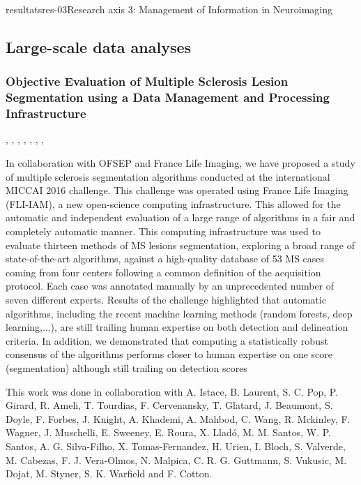 \documentclass{ra2018}
\begin{document}
\begin{module}{resultats}{res-03}{Research axis 3: Management of Information in Neuroimaging}

\subsection{Large-scale data analyses}
\subsubsection{Objective Evaluation of Multiple Sclerosis Lesion Segmentation using a Data Management and Processing Infrastructure}
\begin{participants}
      ,
      ,
      ,
      ,
      ,
      ,
      ,
\end{participants}
In collaboration with OFSEP and France Life Imaging, we have proposed a study of multiple sclerosis segmentation algorithms conducted at the international MICCAI 2016 challenge. This challenge was operated using France Life Imaging (FLI-IAM), a new open-science computing infrastructure. This allowed for the automatic and independent evaluation of a large range of algorithms in a fair and completely automatic manner. This computing infrastructure was used to evaluate thirteen methods of MS lesions segmentation, exploring a broad range of state-of-the-art algorithms, against a high-quality database of 53 MS cases coming from four centers following a common definition of the acquisition protocol. Each case was annotated manually by an unprecedented number of seven different experts. Results of the challenge highlighted that automatic algorithms, including the recent machine learning methods (random forests, deep learning,...), are still trailing human expertise on both detection and delineation criteria. In addition, we demonstrated that computing a statistically robust consensus of the algorithms performs closer to human expertise on one score (segmentation) although still trailing on detection scores~\cite{commowick:inserm-01847873}

This work was done in collaboration with A. Istace, B. Laurent, S. C. Pop, P. Girard, R. Ameli, T. Tourdias, F. Cervenansky, T. Glatard, J. Beaumont, S. Doyle, F. Forbes, J. Knight, A. Khademi, A. Mahbod, C. Wang, R. Mckinley, F. Wagner, J. Muschelli, E. Sweeney, E. Roura, X. Lladó, M. M. Santos, W. P. Santos, A. G. Silva-Filho, X. Tomas-Fernandez, H. Urien, I. Bloch, S. Valverde, M. Cabezas, F. J. Vera-Olmos, N. Malpica, C. R. G. Guttmann, S. Vukusic, M. Dojat, M. Styner, S. K. Warfield and F. Cotton.


\end{module}
\end{document}
